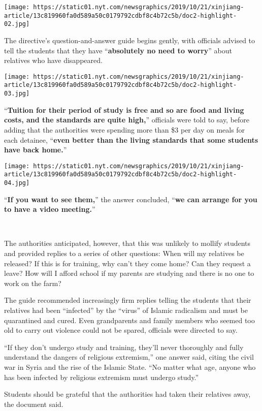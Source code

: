 \texttt{[image: https://static01.nyt.com/newsgraphics/2019/10/21/xinjiang-article/13c819960fa0d589a50c0179792cdbf8c4b72c5b/doc2-highlight-02.jpg]}

The directive's question-and-answer guide begins gently, with officials
advised to tell the students that they have ``\textbf{absolutely no need
to worry}'' about relatives who have disappeared.

\texttt{[image: https://static01.nyt.com/newsgraphics/2019/10/21/xinjiang-article/13c819960fa0d589a50c0179792cdbf8c4b72c5b/doc2-highlight-03.jpg]}

``\textbf{Tuition for their period of study is free and so are food and
living costs, and the standards are quite high,}'' officials were told
to say, before adding that the authorities were spending more than \$3
per day on meals for each detainee, ``\textbf{even better than the
living standards that some students have back home.}''

\texttt{[image: https://static01.nyt.com/newsgraphics/2019/10/21/xinjiang-article/13c819960fa0d589a50c0179792cdbf8c4b72c5b/doc2-highlight-04.jpg]}

``\textbf{If you want to see them,}'' the answer concluded, ``\textbf{we
can arrange for you to have a video meeting.}''

​

The authorities anticipated, however, that this was unlikely to mollify
students and provided replies to a series of other questions: When will
my relatives be released? If this is for training, why can't they come
home? Can they request a leave? How will I afford school if my parents
are studying and there is no one to work on the farm?

The guide recommended increasingly firm replies telling the students
that their relatives had been ``infected'' by the ``virus'' of Islamic
radicalism and must be quarantined and cured. Even grandparents and
family members who seemed too old to carry out violence could not be
spared, officials were directed to say.

``If they don't undergo study and training, they'll never thoroughly and
fully understand the dangers of religious extremism,'' one answer said,
citing the civil war in Syria and the rise of the Islamic State. ``No
matter what age, anyone who has been infected by religious extremism
must undergo study.''

Students should be grateful that the authorities had taken their
relatives away, the document said.

